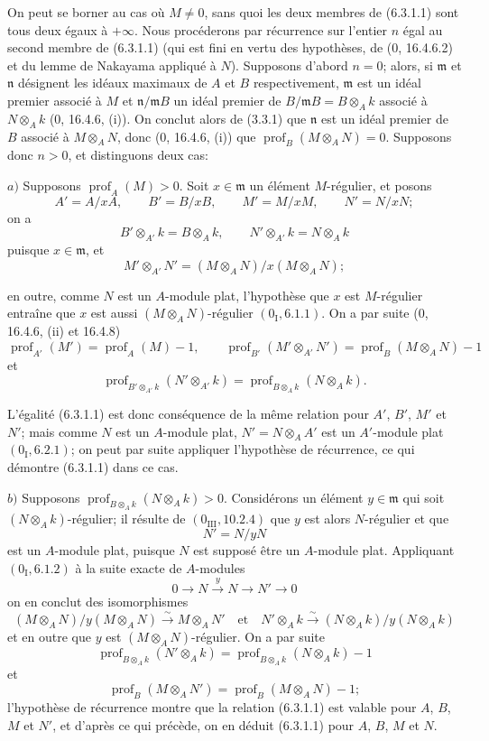 On peut se borner au cas où $M\neq0$, sans quoi les deux membres de (6.3.1.1)
sont tous deux égaux à $+\infty$. Nous procéderons par récurrence sur l'entier
$n$ égal au second membre de (6.3.1.1) (qui est fini en vertu des hypothèses,
de (0, 16.4.6.2) et du lemme de Nakayama appliqué à $N$). Supposons d'abord
$n=0$; alors, si $\mathfrak m$ et $\mathfrak n$ désignent les idéaux maximaux
de $A$ et $B$ respectivement, $\mathfrak m$ est un idéal premier associé à $M$
et $\mathfrak n/\mathfrak mB$ un idéal premier de
$B/\mathfrak mB=B\otimes_Ak$ associé à $N\otimes_Ak$ (0, 16.4.6, (i)). On
conclut alors de (3.3.1) que $\mathfrak n$ est un idéal premier de $B$ associé
à $M\otimes_AN$, donc (0, 16.4.6, (i)) que
$\operatorname{prof}_B(M\otimes_AN)=0$. Supposons donc $n>0$, et distinguons
deux cas:

$a)$ Supposons $\operatorname{prof}_A(M)>0$. Soit $x\in\mathfrak m$ un
élément $M$-régulier, et posons
\[
A'=A/xA,\qquad B'=B/xB,\qquad M'=M/xM,\qquad N'=N/xN;
\]
on a
\[
B'\otimes_{A'}k=B\otimes_Ak,\qquad N'\otimes_{A'}k=N\otimes_Ak
\]
puisque $x\in\mathfrak m$, et
\[
M'\otimes_{A'}N'=(M\otimes_AN)/x(M\otimes_AN);
\]


en outre, comme $N$ est un $A$-module plat, l'hypothèse que $x$ est
$M$-régulier entraîne que $x$ est aussi $(M\otimes_AN)$-régulier
$(0_{\mathrm I}, 6.1.1)$. On a par suite (0, 16.4.6, (ii) et 16.4.8)
\[
\operatorname{prof}_{A'}(M')=\operatorname{prof}_A(M)-1,
\qquad
\operatorname{prof}_{B'}(M'\otimes_{A'}N')
=\operatorname{prof}_B(M\otimes_AN)-1
\]
et
\[
\operatorname{prof}_{B'\otimes_{A'}k}(N'\otimes_{A'}k)
=\operatorname{prof}_{B\otimes_Ak}(N\otimes_Ak).
\]

L'égalité (6.3.1.1) est donc conséquence de la même relation pour $A'$,
$B'$, $M'$ et $N'$; mais comme $N$ est un $A$-module plat,
$N'=N\otimes_AA'$ est un $A'$-module plat $(0_{\mathrm I}, 6.2.1)$; on peut
par suite appliquer l'hypothèse de récurrence, ce qui démontre (6.3.1.1) dans
ce cas.

$b)$ Supposons $\operatorname{prof}_{B\otimes_Ak}(N\otimes_Ak)>0$.
Considérons un élément $y\in\mathfrak m$ qui soit
$(N\otimes_Ak)$-régulier; il résulte de $(0_{\mathrm{III}}, 10.2.4)$ que $y$
est alors $N$-régulier et que
\[
N'=N/yN
\]
est un $A$-module plat, puisque $N$ est supposé être un $A$-module plat.
Appliquant $(0_{\mathrm I}, 6.1.2)$ à la suite exacte de $A$-modules
\[
0\to N\xrightarrow{y}N\to N'\to0
\]
on en conclut des isomorphismes
\[
(M\otimes_AN)/y(M\otimes_AN)\xrightarrow{\sim}M\otimes_AN'
\quad\text{et}\quad
N'\otimes_Ak\xrightarrow{\sim}(N\otimes_Ak)/y(N\otimes_Ak)
\]
et en outre que $y$ est $(M\otimes_AN)$-régulier. On a par suite
\[
\operatorname{prof}_{B\otimes_Ak}(N'\otimes_Ak)
=\operatorname{prof}_{B\otimes_Ak}(N\otimes_Ak)-1
\]
et
\[
\operatorname{prof}_B(M\otimes_AN')
=\operatorname{prof}_B(M\otimes_AN)-1;
\]
l'hypothèse de récurrence montre que la relation (6.3.1.1) est valable pour
$A$, $B$, $M$ et $N'$, et d'après ce qui précède, on en déduit (6.3.1.1)
pour $A$, $B$, $M$ et $N$.

